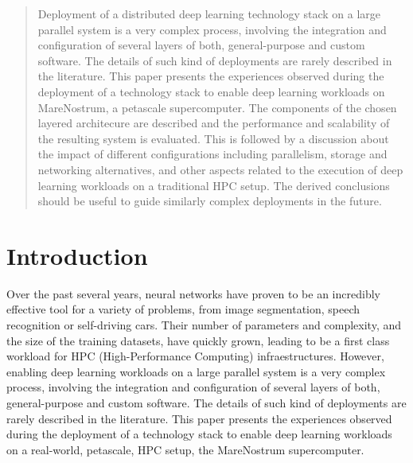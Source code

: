 \documentclass[journal]{IEEEtran}
\begin{document}
\begin{abstract}
Deployment of a distributed deep learning technology stack on a large parallel system is a very complex process, involving the integration and configuration of several layers of both, general-purpose and custom software. The details of such kind of deployments are rarely described in the literature. This paper presents the experiences observed during the deployment of a technology stack to enable deep learning workloads on MareNostrum, a petascale supercomputer. The components of the chosen layered architecure are described and the performance and scalability of the resulting system is evaluated. This is followed by a discussion about the impact of different configurations including parallelism, storage and networking alternatives, and other aspects related to the execution of deep learning workloads on a traditional HPC setup. The derived conclusions should be useful to guide similarly complex deployments in the future.

\end{abstract}




\section{Introduction}

Over the past several years, neural networks have proven to be an incredibly effective tool for a variety of problems, from image segmentation, speech recognition or self-driving cars. Their number of parameters and complexity, and the size of the training datasets, have quickly grown, leading to be a first class workload for HPC (High-Performance Computing) infraestructures. However, enabling deep learning workloads on a large parallel system is a very complex process, involving the integration and configuration of several layers of both, general-purpose and custom software. The details of such kind of deployments are rarely described in the literature. This paper presents the experiences observed during the deployment of a technology stack to enable deep learning workloads on a real-world, petascale, HPC setup, the MareNostrum supercomputer. 
\end{document}
